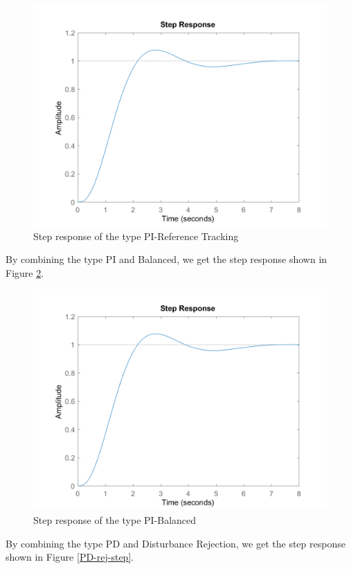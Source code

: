 \documentclass[a4paper, twocolumn, titlepage, 10pt]{article}
\begin{document}
		\begin{figure}[H]
			\centering
			\includegraphics[width=\linewidth]{PI-track-step}
			\caption{Step response of the type PI-Reference Tracking}
			\label{PI-track-step}
		\end{figure}
					   	By combining the type PI and Balanced, we get the step response shown in Figure \ref{PI-balance-step}.
\begin{figure}[H]
	\centering
	\includegraphics[width=\linewidth]{PI-balance-step}
	\caption{Step response of the type PI-Balanced}
	\label{PI-balance-step}	
\end{figure}
						   	By combining the type PD and Disturbance Rejection, we get the step response shown in Figure \ref{PD-rej-step}.
\end{document}
